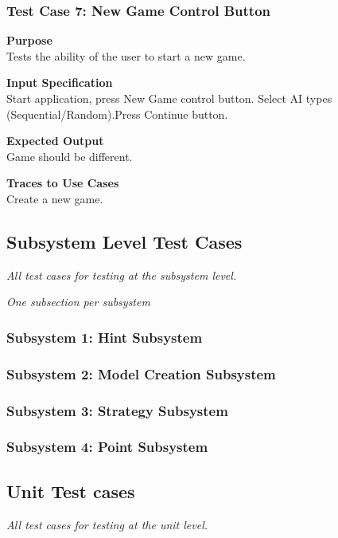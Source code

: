 \documentclass[12pt]{article}
\begin{document}
\subsubsection{Test Case 7: New Game Control Button} \label{tc:7}

\noindent
{\bf Purpose}\\
Tests the ability of the user to start a new game.

\noindent
{\bf Input Specification}\\
Start application, press New Game control button. Select AI types (Sequential/Random).Press Continue button.

\noindent
{\bf Expected Output}\\
Game should be different.

\noindent
{\bf Traces to Use Cases}\\
Create a new game.

\subsection{Subsystem Level Test Cases}

{\it
All test cases for testing at the subsystem level.
}

{\it
One subsection per subsystem
}

\subsubsection{Subsystem 1: Hint Subsystem}

\subsubsection{Subsystem 2: Model Creation Subsystem}

\subsubsection{Subsystem 3: Strategy Subsystem}

\subsubsection{Subsystem 4: Point Subsystem}

\subsection{Unit Test cases}

{\it
All test cases for testing at the unit level.
}
\end{document}
